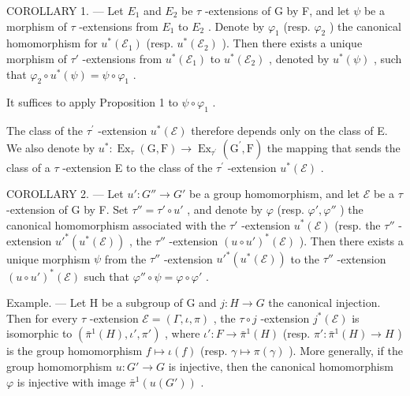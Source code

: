 COROLLARY 1. --- Let \(E_{1}\) and \(E_{2}\) be \(\tau\) -extensions of G by F, and let \(\psi\) be a morphism of \(\tau\) -extensions from \(E_{1}\) to \(E_{2}\) . Denote by \(\varphi_{1}\) (resp. \(\varphi_{2}\) ) the canonical homomorphism for \(u^{*}(\mathcal{E}_{1})\) (resp. \(u^{*}(\mathcal{E}_{2})\) ). Then there exists a unique morphism of \(\tau'\) -extensions from \(u^{*}(\mathcal{E}_{1})\) to \(u^{*}(\mathcal{E}_{2})\) , denoted by \(u^{*}(\psi)\) , such that \(\varphi_{2} \circ u^{*}(\psi) = \psi \circ \varphi_{1}\) .

It suffices to apply Proposition 1 to \(\psi \circ \varphi_{1}\) .

The class of the \(\tau^{\prime}\) -extension \(u^{*}(\mathcal{E})\) therefore depends only on the class of E. We also denote by \(u^{*}:\operatorname{Ex}_{\tau}(\mathrm{G},\mathrm{F})\to\operatorname{Ex}_{\tau^{\prime}}(\mathrm{G}^{\prime},\mathrm{F})\) the mapping that sends the class of a \(\tau\) -extension E to the class of the \(\tau^{\prime}\) -extension \(u^{*}(\mathcal{E})\) .

COROLLARY 2. --- Let \(u': G'' \to G'\) be a group homomorphism, and let \(\mathcal{E}\) be a \(\tau\) -extension of G by F. Set \(\tau'' = \tau' \circ u'\) , and denote by \(\varphi\) (resp. \(\varphi', \varphi''\) ) the canonical homomorphism associated with the \(\tau'\) -extension \(u^*(\mathcal{E})\) (resp. the \(\tau''\) -extension \(u'^*(u^*(\mathcal{E}))\) , the \(\tau''\) -extension \((u \circ u')^*(\mathcal{E})\) ). Then there exists a unique morphism \(\psi\) from the \(\tau''\) -extension \(u'^*(u^*(\mathcal{E}))\) to the \(\tau''\) -extension \((u \circ u')^*(\mathcal{E})\) such that \(\varphi'' \circ \psi = \varphi \circ \varphi'\) .

Example. --- Let H be a subgroup of G and \(j : H \to G\) the canonical injection. Then for every \(\tau\) -extension \(\mathcal{E} = (\Gamma, \iota, \pi)\) , the \(\tau \circ j\) -extension \(j^{*}(\mathcal{E})\) is isomorphic to \((\bar{\pi}^{1}(H), \iota', \pi')\) , where \(\iota' : F \to \bar{\pi}^{1}(H)\) (resp. \(\pi' : \bar{\pi}^{1}(H) \to H\) ) is the group homomorphism \(f \mapsto \iota(f)\) (resp. \(\gamma \mapsto \pi(\gamma)\) ). More generally, if the group homomorphism \(u : G' \to G\) is injective, then the canonical homomorphism \(\varphi\) is injective with image \(\bar{\pi}^{1}(u(G'))\) .
\relax{}
